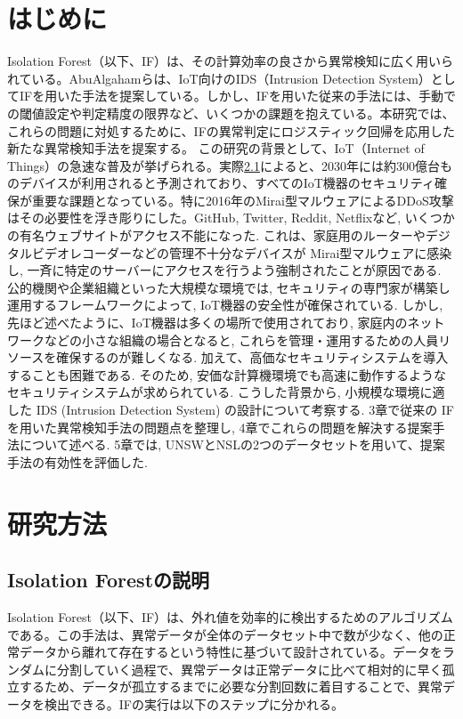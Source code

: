 \documentclass{css}
\begin{document}
\section{はじめに}
Isolation Forest（以下、IF）は、その計算効率の良さから異常検知に広く用いられている。AbuAlgahamらは、IoT向けのIDS（Intrusion Detection System）としてIFを用いた手法を提案している。しかし、IFを用いた従来の手法には、手動での閾値設定や判定精度の限界など、いくつかの課題を抱えている。本研究では、これらの問題に対処するために、IFの異常判定にロジスティック回帰を応用した新たな異常検知手法を提案する。
この研究の背景として、IoT（Internet of Things）の急速な普及が挙げられる。実際\ref{}によると、2030年には約300億台ものデバイスが利用されると予測されており、すべてのIoT機器のセキュリティ確保が重要な課題となっている。特に2016年のMirai型マルウェアによるDDoS攻撃はその必要性を浮き彫りにした。GitHub, Twitter, Reddit, Netflixなど, いくつかの有名ウェブサイトがアクセス不能になった. これは、家庭用のルーターやデジタルビデオレコーダーなどの管理不十分なデバイスが Mirai型マルウェアに感染し, 一斉に特定のサーバーにアクセスを行うよう強制されたことが原因である.
公的機関や企業組織といった大規模な環境では, セキュリティの専門家が構築し運用するフレームワークによって, IoT機器の安全性が確保されている. しかし, 先ほど述べたように、IoT機器は多くの場所で使用されており, 家庭内のネットワークなどの小さな組織の場合となると, これらを管理・運用するための人員リソースを確保するのが難しくなる. 加えて、高価なセキュリティシステムを導入することも困難である. そのため, 安価な計算機環境でも高速に動作するようなセキュリティシステムが求められている.
こうした背景から, 小規模な環境に適した IDS (Intrusion Detection System) の設計について考察する. 3章で従来の IF を用いた異常検知手法の問題点を整理し, 4章でこれらの問題を解決する提案手法について述べる. 5章では, UNSWとNSLの2つのデータセットを用いて、提案手法の有効性を評価した.

\section{研究方法}

\subsection{Isolation Forestの説明}

Isolation Forest（以下、IF）は、外れ値を効率的に検出するためのアルゴリズムである。この手法は、異常データが全体のデータセット中で数が少なく、他の正常データから離れて存在するという特性に基づいて設計されている。データをランダムに分割していく過程で、異常データは正常データに比べて相対的に早く孤立するため、データが孤立するまでに必要な分割回数に着目することで、異常データを検出できる。IFの実行は以下のステップに分かれる。
\end{document}
